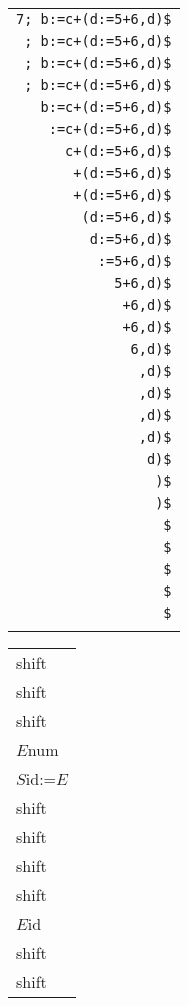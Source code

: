 \begin{slide*}
\begin{minipage}[t]{4cm}
\begin{small}
\begin{tabular}[t]{r}
{\tt 7; b:=c+(d:=5+6,d)\$}\\
{\tt ; b:=c+(d:=5+6,d)\$}\\
{\tt ; b:=c+(d:=5+6,d)\$}\\
{\tt ; b:=c+(d:=5+6,d)\$}\\
{\tt b:=c+(d:=5+6,d)\$}\\
{\tt :=c+(d:=5+6,d)\$}\\
{\tt c+(d:=5+6,d)\$}\\
{\tt +(d:=5+6,d)\$}\\
{\tt +(d:=5+6,d)\$}\\
{\tt (d:=5+6,d)\$}\\
{\tt d:=5+6,d)\$}\\
{\tt :=5+6,d)\$}\\
{\tt 5+6,d)\$}\\
{\tt +6,d)\$}\\
{\tt +6,d)\$}\\
{\tt 6,d)\$}\\
{\tt ,d)\$}\\
{\tt ,d)\$}\\
{\tt ,d)\$}\\
{\tt ,d)\$}\\
{\tt d)\$}\\
{\tt )\$}\\
{\tt )\$}\\
{\tt \$}\\
{\tt \$}\\
{\tt \$}\\
{\tt \$}\\
{\tt \$}\\
\\
\end{tabular}
\end{small}
\end{minipage}
\begin{minipage}[t]{1cm}
\renewcommand{\arraystretch}{0.71}
\begin{small}
\begin{tabular}[t]{l}
shift\\
shift\\
shift\\
$E$\RA{}num\\
$S$\RA{}id:=$E$\\
shift\\
shift\\
shift\\
shift\\
$E$\RA{}id\\
shift\\
shift\\

\end{tabular}
\end{small}
\end{minipage}
\end{slide*}
